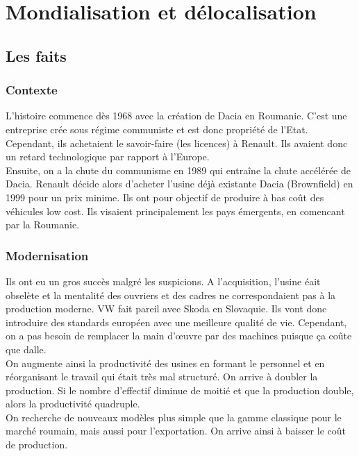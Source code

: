 
\chapter{Mondialisation et délocalisation}
\section{Les faits}
\subsection{Contexte}
L'histoire commence dès 1968 avec la création de Dacia en Roumanie. C'est une entreprise crée sous régime communiste et est donc propriété de l'Etat. Cependant, ils achetaient le savoir-faire (les licences) à Renault. Ils avaient donc un retard technologique par rapport à l'Europe. \\
Ensuite, on a la chute du communisme en 1989 qui entraîne la chute accélérée de Dacia. Renault décide alors d'acheter l'usine déjà existante Dacia (Brownfield) en 1999 pour un prix minime. Ils ont pour objectif de  produire à bas coût des véhicules low cost. Ils visaient principalement les pays émergents, en comencant par la Roumanie. 

\subsection{Modernisation}
Ils ont eu un gros succès malgré les suspicions. A l'acquisition, l'usine éait obselète et la mentalité des ouvriers et des cadres ne correspondaient pas à la production moderne. VW fait pareil avec Skoda en Slovaquie. Ils vont donc introduire des standards européen avec une meilleure qualité de vie. Cependant, on a pas besoin de remplacer la main d'œuvre par des machines puisque ça coûte que dalle. \\
On augmente ainsi la productivité des usines en formant le personnel et en réorganisant le travail qui était très mal structuré. On arrive à doubler la production. Si le nombre d'effectif diminue de moitié et que la production double, alors la productivité quadruple.\\
On recherche de nouveaux modèles plus simple que la gamme classique pour le marché roumain, mais aussi pour l'exportation. On arrive ainsi à baisser le coût de production.

